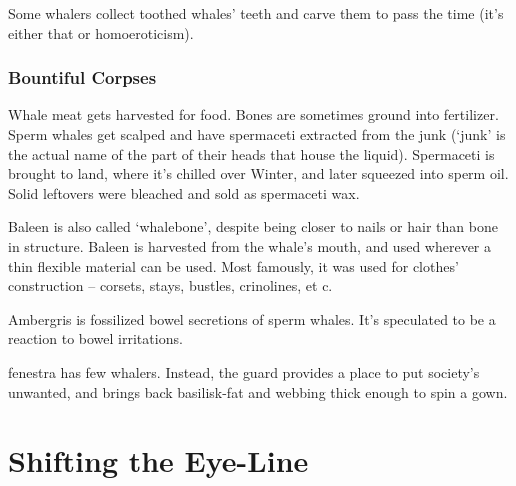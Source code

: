 \begin{multicols}{2}
Some whalers collect toothed whales' teeth and carve them to pass the time (it's either that or homoeroticism).

\subsubsection{Bountiful Corpses}

Whale meat gets harvested for food.
Bones are sometimes ground into fertilizer.
Sperm whales get scalped and have spermaceti extracted from the junk
(`junk' is the actual name of the part of their heads that house the liquid).
Spermaceti is brought to land, where it's chilled over Winter, and later squeezed into sperm oil.
Solid leftovers were bleached and sold as spermaceti wax.

Baleen is also called `whalebone', despite being closer to nails or hair than bone in structure.
Baleen is harvested from the whale's mouth, and used wherever a thin flexible material can be used.
Most famously, it was used for clothes' construction -- corsets, stays, bustles, crinolines, et c.

Ambergris is fossilized bowel secretions of sperm whales.
It's speculated to be a reaction to bowel irritations.

\end{multicols}

\Gls{fenestra} has few whalers.
Instead, the \gls{guard} provides a place to put society's unwanted, and brings back basilisk-fat and webbing thick enough to spin a gown.

\clearpage

\section*{Shifting the Eye-Line}

